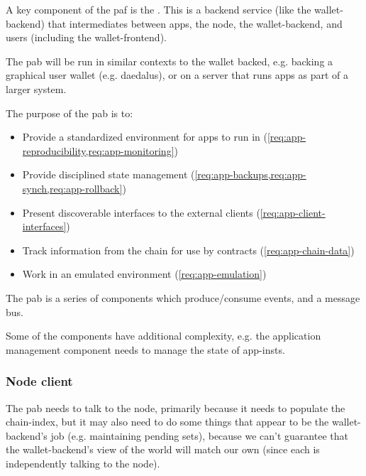 \documentclass[plutus.tex]{subfiles}
\begin{document}
\medskip

A key component of the \gls{paf} is the .
This is a backend service (like the \gls{wallet-backend}) that intermediates between \glspl{app}, the \gls{node}, the \gls{wallet-backend}, and users (including the \gls{wallet-frontend}).

The \gls{pab} will be run in similar contexts to the wallet backed, e.g. backing a graphical user wallet (e.g. \gls{daedalus}), or on a server that runs \glspl{app} as part of a larger system.

The purpose of the \gls{pab} is to:
\begin{itemize}
\item Provide a standardized environment for \glspl{app} to run in (\cref{req:app-reproducibility,req:app-monitoring})
\item Provide disciplined state management (\cref{req:app-backups,req:app-synch,req:app-rollback})
\item Present discoverable interfaces to the external clients (\cref{req:app-client-interfaces})
\item Track information from the chain for use by contracts (\cref{req:app-chain-data})
\item Work in an emulated environment (\cref{req:app-emulation})
\end{itemize}

The \gls{pab} is a series of components which produce/consume events, and a message bus.

Some of the components have additional complexity, e.g. the application management component needs to manage the state of \glspl{app-inst}.

\subsubsection{Node client}
The \gls{pab} needs to talk to the \gls{node}, primarily because it needs to populate the \gls{chain-index}, but it may also need to do some things that appear to be the \gls{wallet-backend}'s job (e.g. maintaining pending sets), because we can't guarantee that the \gls{wallet-backend}'s view of the world will match our own (since each is independently talking to the \gls{node}).
\end{document}
